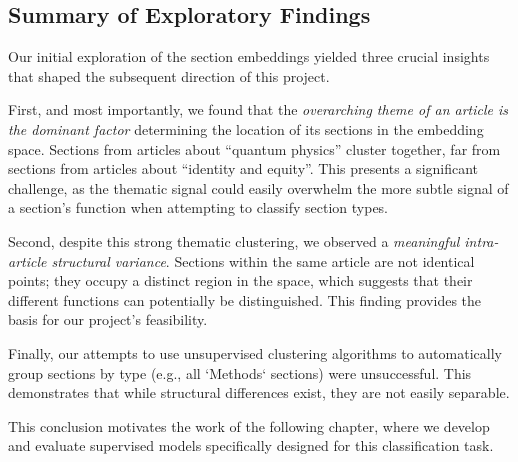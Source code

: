 \subsection{Summary of Exploratory Findings}

Our initial exploration of the section embeddings yielded three crucial insights
that shaped the subsequent direction of this project.

First, and most importantly, we found that the \emph{overarching theme of an
article is the dominant factor} determining the location of its sections in the
embedding space. Sections from articles about ``quantum physics'' cluster
together, far from sections from articles about ``identity and equity''. This
presents a significant challenge, as the thematic signal could easily overwhelm
the more subtle signal of a section's function when attempting to classify
section types.

Second, despite this strong thematic clustering, we observed a \emph{meaningful
intra-article structural variance}. Sections within the same article are not
identical points; they occupy a distinct region in the space, which suggests
that their different functions can potentially be distinguished. This finding
provides the basis for our project's feasibility.

Finally, our attempts to use unsupervised clustering algorithms to automatically
group sections by type (e.g., all `Methods` sections) were unsuccessful. This
demonstrates that while structural differences exist, they are not easily
separable.

This conclusion motivates the work of the following chapter, where we develop
and evaluate supervised models specifically designed for this classification
task.